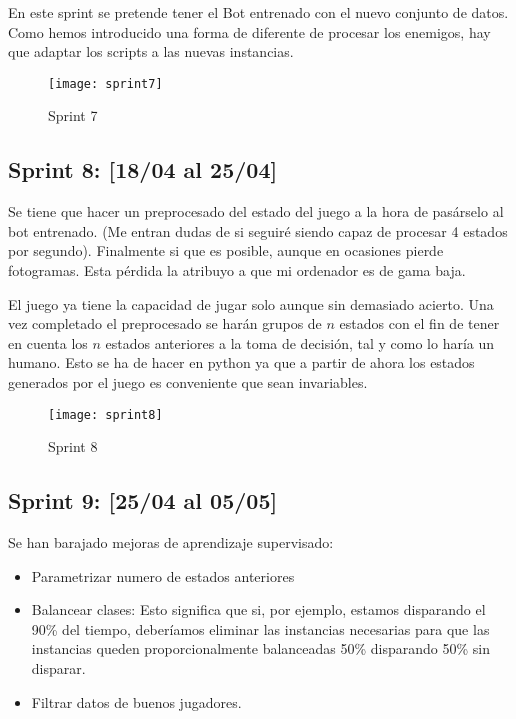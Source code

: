 En este sprint se pretende tener el Bot entrenado con el nuevo conjunto de datos. Como hemos introducido una forma de diferente de procesar los enemigos, hay que adaptar los scripts a las nuevas instancias.

\begin{figure}[h!]
    \centering
    \texttt{[image: sprint7]}
    \caption{Sprint 7}
    \label{fig:s7}
\end{figure}



\subsection{Sprint 8: [18/04 al 25/04]}

Se tiene que hacer un preprocesado del estado del juego a la hora de pasárselo al bot entrenado. (Me entran dudas de si seguiré siendo capaz de procesar 4 estados por segundo). Finalmente si que es posible, aunque en ocasiones pierde fotogramas. Esta pérdida la atribuyo a que mi ordenador es de gama baja.

El juego ya tiene la capacidad de jugar solo aunque sin demasiado acierto. Una vez completado el preprocesado se harán grupos de $n$ estados con el fin de tener en cuenta los $n$ estados anteriores a la toma de decisión, tal y como lo haría un humano. Esto se ha de hacer en python ya que a partir de ahora los estados generados por el juego es conveniente que sean invariables.

\begin{figure}[h!]
    \centering
    \texttt{[image: sprint8]}
    \caption{Sprint 8}
    \label{fig:s8}
\end{figure}

\subsection{Sprint 9: [25/04 al 05/05]}

Se han barajado mejoras de aprendizaje supervisado: 
\begin{itemize}
    \item Parametrizar numero de estados anteriores
    \item Balancear clases: Esto significa que si, por ejemplo, estamos disparando el 90\% del tiempo, deberíamos eliminar las instancias necesarias para que las instancias queden proporcionalmente balanceadas 50\% disparando 50\% sin disparar. 
    \item Filtrar datos de buenos jugadores.
\end{itemize}
  
